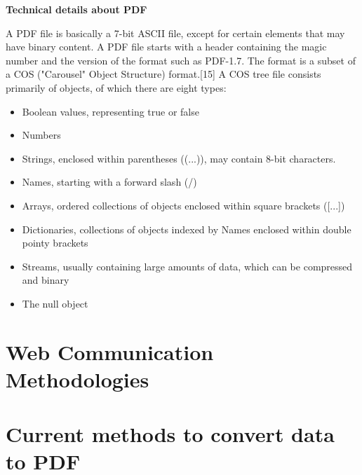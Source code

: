 \documentclass[paper.tex]{subfiles}
\begin{document}
\bigbreak
\textbf{Technical details about PDF}
\par
A PDF file is basically a 7-bit ASCII file, except for certain elements that may have binary content. A PDF file starts with a header containing the magic number and the version of the format such as PDF-1.7. The format is a subset of a COS ("Carousel" Object Structure) format.[15] A COS tree file consists primarily of objects, of which there are eight types:

\begin{itemize}
  \item Boolean values, representing true or false
  \item Numbers
  \item Strings, enclosed within parentheses ((...)), may contain 8-bit characters.
  \item Names, starting with a forward slash (/)
  \item Arrays, ordered collections of objects enclosed within square brackets ([...])
  \item Dictionaries, collections of objects indexed by Names enclosed within double pointy brackets
  \item Streams, usually containing large amounts of data, which can be compressed and binary
  \item The null object
\end{itemize}

\section{Web Communication Methodologies}

\section{Current methods to convert data to PDF}
\end{document}
